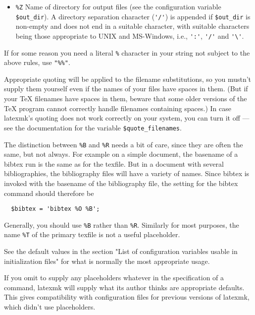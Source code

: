\begin{itemize}
\item \verb|%Z|     Name  of directory for output files (see the configuration
        variable \verb|$out_dir|).  A directory separation character (\verb|'/'|)
        is  appended  if  \verb|$out_dir| is non-empty and does not end in a
        suitable character, with suitable characters being those  appropriate
        to UNIX and MS-Windows, i.e., \verb|':'|, \verb|'/'| and \verb|'\'|.

\end{itemize}

If  for  some  reason you need a literal \verb|%| character in your string not
subject to the above rules, use \verb|"%%"|.

Appropriate quoting will be applied to the filename  substitutions,  so
you  mustn't  supply them yourself even if the names of your files have
spaces in them.  (But if your TeX filenames have spaces in them, beware
that  some  older  versions  of the TeX program cannot correctly handle
filenames containing spaces.)  In case latexmk's quoting does not  work
correctly  on your system, you can turn it off --- see the documentation
for the variable \verb|$quote_filenames|.

The distinction between \verb|%B| and \verb|%R| needs a bit of care, since  they  are
often  the same, but not always.  For example on a simple document, the
basename of a bibtex run is the same as for the texfile.  But in a document
with  several bibliographies, the bibliography files will have a variety of
names.  Since bibtex is invoked with  the  basename  of  the bibliography
file, the setting for the bibtex command should therefore be

\begin{verbatim}
  $bibtex = 'bibtex %O %B';
\end{verbatim}

Generally, you should use \verb|%B| rather than \verb|%R|.  Similarly for  most
purposes, the name \verb|%T| of the primary texfile is not a useful placeholder.

See  the default values in the section "List of configuration variables usable
in initialization files" for what is normally the most appropriate usage.

If you omit to supply any placeholders whatever in the specification of a
command, latexmk will supply what its author thinks  are  appropriate defaults.
This gives compatibility with configuration files for previous versions of
latexmk, which didn't use placeholders.

